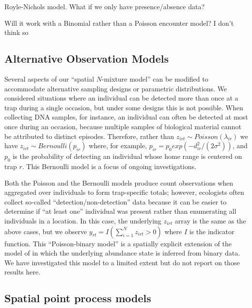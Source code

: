 Royle-Nichols model. What if we only have presence/absence data?

Will it work with a Binomial rather than a Poisson encounter model? I
don't think so










\subsection{Alternative Observation Models}
\label{Sect.alt-obsmods}

Several aspects of our ``spatial $N$-mixture model'' can be modified
to accommodate
alternative sampling designs or parametric distributions.
We considered situations where an individual can be detected more than
once at a trap during a single occasion, but under some designs this
is not possible. When collecting DNA samples, for instance, an
individual can often be detected at most once during an
occasion, because multiple samples of biological material cannot be
attributed
to distinct episodes. Therefore, rather than $z_{irt} \sim Poisson(\lambda_{ir})$
we have $z_{irt} \sim Bernoulli(p_{ir})$ where, for example,  $p_{ir} = p_0
exp(-d_{ir}^2/(2\sigma^2))$, and $p_0$ is the probability of
detecting an individual whose home range is centered on trap $r$. This
Bernoulli model is a focus of ongoing investigations.

Both the Poisson and the Bernoulli models
produce count observations when aggregated over individuals to form
trap-specific totals; however, ecologists often collect so-called
``detection/non-detection'' data because it can be easier to determine
if ``at least one'' individual was present rather than enumerating all
individuals in a location. In this case, the underlying $z_{irt}$
array is the same as the above cases, but we observe $y_{rt} =
I(\sum_{i=1}^{N} z_{irt} > 0)$ where $I$ is the indicator
function. This ``Poisson-binary model'' is
a spatially explicit extension of the model of
\citet{royle_nichols:2003} in which the underlying abundance state
is inferred from binary data. We have investigated this model to a
limited extent but do not report on those results here.


\subsection{Spatial point process models}


